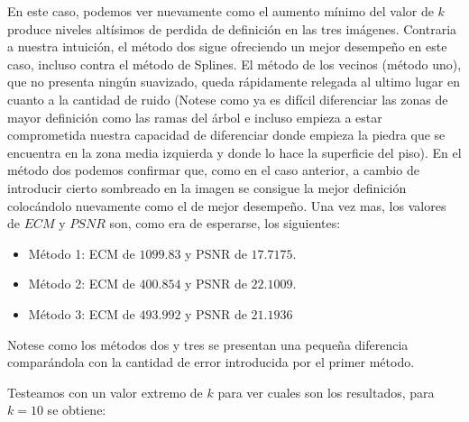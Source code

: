 En este caso, podemos ver nuevamente como el aumento mínimo del valor de $k$ produce niveles altísimos de perdida de definición en las tres imágenes. Contraria a nuestra intuición, el método dos sigue ofreciendo un mejor desempeño en este caso, incluso contra el método de Splines. El método de los vecinos (método uno), que no presenta ningún suavizado, queda rápidamente relegada al ultimo lugar en cuanto a la cantidad de ruido (Notese como ya es difícil diferenciar las zonas de mayor definición como las ramas del árbol e incluso empieza a estar comprometida nuestra capacidad de diferenciar donde empieza la piedra que se encuentra en la zona media izquierda y donde lo hace la superficie del piso). En el método dos podemos confirmar que, como en el caso anterior, a cambio de introducir cierto sombreado en la imagen se consigue la mejor definición colocándolo nuevamente como el de mejor desempeño.
Una vez mas, los valores de $ECM$ y $PSNR$ son, como era de esperarse, los siguientes:
\begin{itemize}
 \item Método 1: ECM de $1099.83$ y PSNR de $17.7175$.
 \item Método 2: ECM de $400.854$ y PSNR de $22.1009$.
 \item Método 3: ECM de $493.992$ y PSNR de $21.1936$
\end{itemize}
Notese como los métodos dos y tres se presentan una pequeña diferencia comparándola con la cantidad de error introducida por el primer método.

Testeamos con un valor extremo de $k$ para ver cuales son los resultados, para $k=10$ se obtiene:


